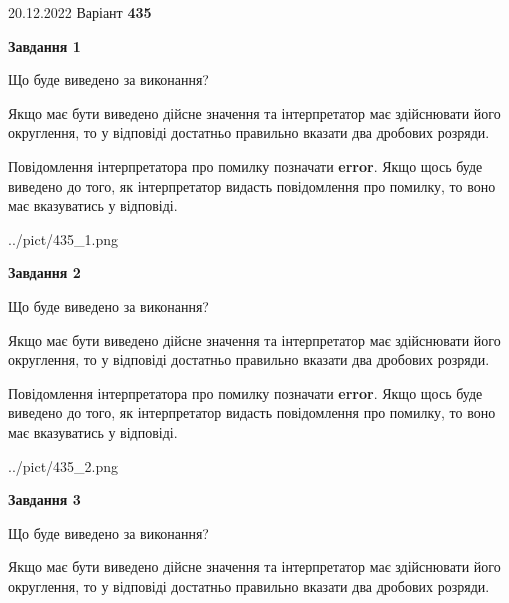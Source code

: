 \documentclass[12pt, ukrainian]{article}
\begin{document}
{20.12.2022 Варіант \No \textbf { 435 }\par}
{
\begin {Large}

{\begin {center}\textbf{Завдання 1}\end {center}}\par
Що буде виведено за виконання? \par

Якщо має бути виведено дійсне значення та інтерпретатор має здійснювати його округлення, 
то у відповіді достатньо правильно вказати два дробових розряди.

Повідомлення інтерпретатора про помилку позначати \textbf{error}.
Якщо щось буде виведено до того, як інтерпретатор видасть повідомлення про помилку, 
то воно має вказуватись у відповіді. \par

\begin{center}
	{../pict/435_1.png}
\end{center}
\newpage

{\begin {center}\textbf{Завдання 2}\end {center}}\par
Що буде виведено за виконання? \par

Якщо має бути виведено дійсне значення та інтерпретатор має здійснювати його округлення, 
то у відповіді достатньо правильно вказати два дробових розряди.

Повідомлення інтерпретатора про помилку позначати \textbf{error}.
Якщо щось буде виведено до того, як інтерпретатор видасть повідомлення про помилку, 
то воно має вказуватись у відповіді. \par

\begin{center}
	{../pict/435_2.png}
\end{center}
\newpage

{\begin {center}\textbf{Завдання 3}\end {center}}\par
Що буде виведено за виконання? \par

Якщо має бути виведено дійсне значення та інтерпретатор має здійснювати його округлення, 
то у відповіді достатньо правильно вказати два дробових розряди.


\end{Large}}
\end{document}
